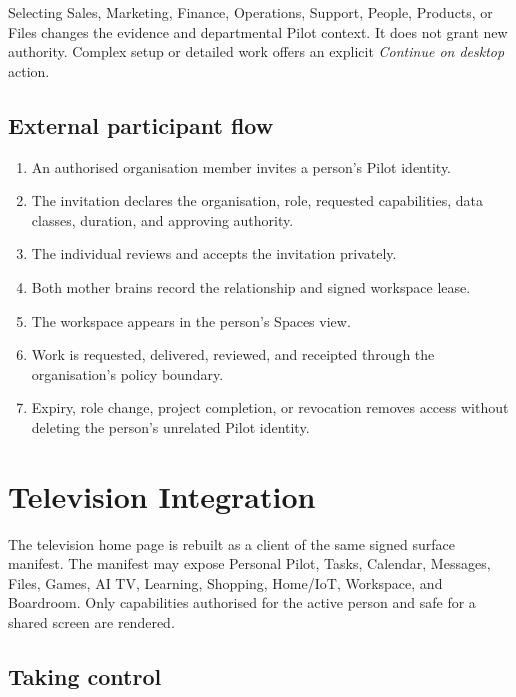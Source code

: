 \documentclass[11pt,a4paper]{article}
\begin{document}
Selecting Sales, Marketing, Finance, Operations, Support, People, Products, or
Files changes the evidence and departmental Pilot context.  It does not grant
new authority.  Complex setup or detailed work offers an explicit
\emph{Continue on desktop} action.

\subsection{External participant flow}

\begin{enumerate}[leftmargin=*]
  \item An authorised organisation member invites a person's Pilot identity.
  \item The invitation declares the organisation, role, requested capabilities,
        data classes, duration, and approving authority.
  \item The individual reviews and accepts the invitation privately.
  \item Both mother brains record the relationship and signed workspace lease.
  \item The workspace appears in the person's Spaces view.
  \item Work is requested, delivered, reviewed, and receipted through the
        organisation's policy boundary.
  \item Expiry, role change, project completion, or revocation removes access
        without deleting the person's unrelated Pilot identity.
\end{enumerate}

\section{Television Integration}

The television home page is rebuilt as a client of the same signed surface
manifest.  The manifest may expose Personal Pilot, Tasks, Calendar, Messages,
Files, Games, AI TV, Learning, Shopping, Home/IoT, Workspace, and Boardroom.
Only capabilities authorised for the active person and safe for a shared screen
are rendered.

\subsection{Taking control}
\end{document}

